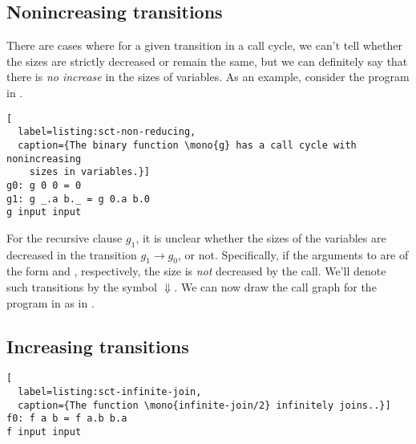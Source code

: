 \subsection{Nonincreasing transitions}

There are cases where for a given transition in a call cycle, we can't tell
whether the sizes are strictly decreased or remain the same, but we can
definitely say that there is \emph{no increase} in the sizes of variables. As
an example, consider the program in .

\begin{lstlisting}[
  label=listing:sct-non-reducing,
  caption={The binary function \mono{g} has a call cycle with nonincreasing
    sizes in variables.}]
g0: g 0 0 = 0
g1: g _.a b._ = g 0.a b.0
g input input
\end{lstlisting}


For the recursive clause $g_1$, it is unclear whether the sizes of the
variables are decreased in the transition $g_1\rightarrow g_0$, or not.
Specifically, if the arguments to  are of the form  and
, respectively, the size is \emph{not} decreased by the call. We'll
denote such transitions by the symbol $\Downarrow$. We can now draw the call
graph for the program in  as in
.



\subsection{Increasing transitions}




\begin{lstlisting}[
  label=listing:sct-infinite-join,
  caption={The function \mono{infinite-join/2} infinitely joins..}]
f0: f a b = f a.b b.a
f input input
\end{lstlisting}





